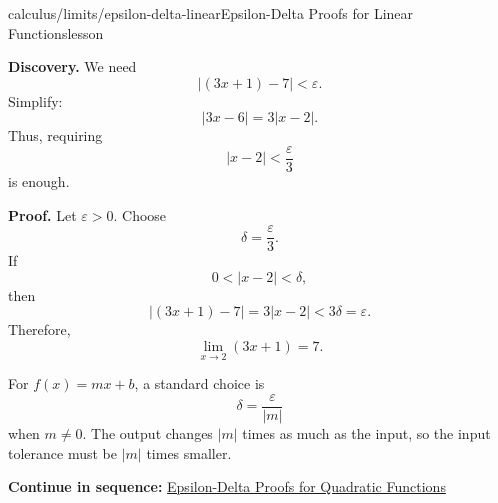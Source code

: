\documentclass[11pt,openany]{book}
\theoremstyle{bgplain}
\newcounter{bgexample}[chapter]
\newcommand{\webnext}[2]{%
  \par\addvspace{1.2em}\noindent{\color{BGLine}\rule{\textwidth}{0.35pt}}\par\smallskip
  {\small\color{BGGray}\textbf{Continue in sequence:} \hyperlink{web:#1}{#2}}\par
}
\newcommand{\eps}{\varepsilon}
\begin{document}
\begin{webpage}{calculus/limits/epsilon-delta-linear}{Epsilon-Delta Proofs for Linear Functions}{lesson}
\begin{bgexample}[title={A general linear function}]
\begin{bgsolution}
\textbf{Discovery.} We need
\[
  |(3x+1)-7|<\eps.
\]
Simplify:
\[
  |3x-6|=3|x-2|.
\]
Thus, requiring
\[
  |x-2|<\frac\eps3
\]
is enough.

\textbf{Proof.} Let \(\eps>0\). Choose
\[
  \delta=\frac\eps3.
\]
If
\[
  0<|x-2|<\delta,
\]
then
\[
  |(3x+1)-7|=3|x-2|<3\delta=\eps.
\]
Therefore,
\[
  \boxed{\lim_{x\to2}(3x+1)=7}.
\]
\end{bgsolution}
\end{bgexample}

\begin{bgsummary}
For \(f(x)=mx+b\), a standard choice is
\[
  \delta=\frac\eps{|m|}
\]
when \(m\ne0\). The output changes \(|m|\) times as much as the input, so the input tolerance must be \(|m|\) times smaller.
\end{bgsummary}
\webnext{calculus/limits/epsilon-delta-quadratic}{Epsilon-Delta Proofs for Quadratic Functions}
\end{webpage}
\end{document}

